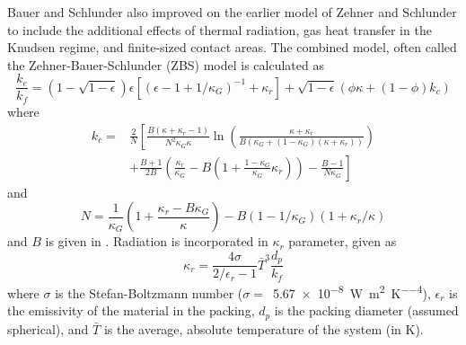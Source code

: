 Bauer and Schlunder \cite{bauer1978effective} also improved on the earlier model of Zehner and Schlunder to include the additional effects of thermal radiation, gas heat transfer in the Knudsen regime, and finite-sized contact areas. The combined model, often called the Zehner-Bauer-Schlunder (ZBS) model is calculated as
\begin{equation}
    \frac{k_e}{k_f} = \left(1-\sqrt{1-\epsilon}\right)\epsilon\left[\left(\epsilon-1+1/\kappa_G\right)^{-1} + \kappa_r\right]+\sqrt{1-\epsilon}\left(\phi\kappa + (1-\phi)k_c\right)
\end{equation}
where
\begin{equation}
\begin{split}
    k_c ={} &\frac{2}{N}\left[\frac{B(\kappa+\kappa_r -1)}{N^2\kappa_G\kappa}\ln\left(\frac{\kappa+\kappa_r}{B(\kappa_G+(1-\kappa_G)(\kappa+\kappa_r))}\right) \right.\\
    &+\left.\frac{B+1}{2B}\left(\frac{\kappa_r}{\kappa_G} - B\left(1+\frac{1-\kappa_G}{\kappa_G}\kappa_r\right) \right) - \frac{B-1}{N\kappa_G}\right]
\end{split}
\end{equation}
and
\begin{equation}
    N = \frac{1}{\kappa_G}\left(1+\frac{\kappa_r-B\kappa_G}{\kappa} \right) - B(1-1/\kappa_G)(1+\kappa_r/\kappa)
\end{equation}
and $B$ is given in . Radiation is incorporated in $\kappa_r$ parameter, given as
\begin{equation}
    \kappa_r = \frac{4\sigma}{2/\epsilon_r - 1}\bar{T}^3\frac{d_p}{k_f}
\end{equation}
where $\sigma$ is the Stefan-Boltzmann number ($\sigma = $~\SI{5.67e-8}{\watt\per\meter\squared\per\kelvin\tothe{4}}), $\epsilon_r$ is the emissivity of the material in the packing, $d_p$ is the packing diameter (assumed spherical), and $\bar{T}$ is the average, absolute temperature of the system (in \si{\kelvin}). 

